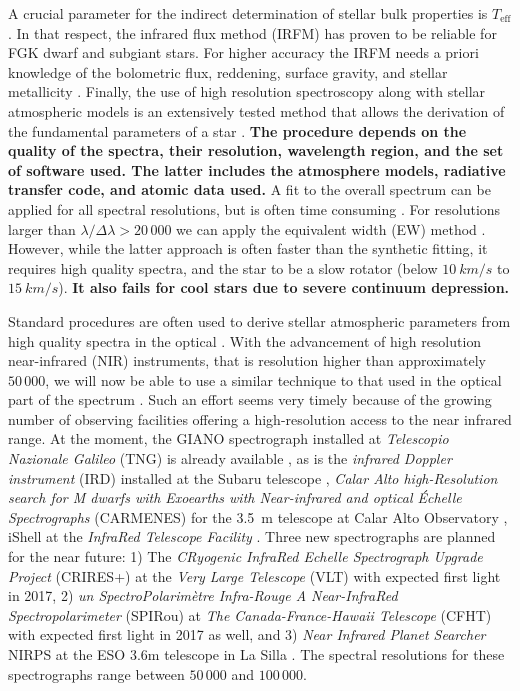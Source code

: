 \documentclass{aa}
\begin{document}
A crucial parameter for the indirect determination of stellar bulk properties is
$T_\mathrm{eff}$. In that respect, the infrared flux method (IRFM) has proven to
be reliable for FGK dwarf and subgiant stars. For higher accuracy the IRFM needs
a priori knowledge of the bolometric flux, reddening, surface gravity, and
stellar metallicity \citep{Blackwell1977,Ramirez2005b,Casagrande2010}. Finally,
the use of high resolution spectroscopy along with stellar atmospheric models is
an extensively tested method that allows the derivation of the fundamental
parameters of a star \citep[see e.g.][]{Valenti2005,Santos13,Worley2016}. {\bf
The procedure depends on the quality of the spectra, their resolution,
wavelength region, and the set of software used. The latter includes the
atmosphere models, radiative transfer code, and atomic data used.} A fit to the
overall spectrum can be applied for all spectral resolutions, but is often time
consuming \citep[see e.g.][]{Recio2006,Tsantaki2014}. For resolutions larger
than $\lambda/\Delta\lambda > 20\,000$ we can apply the equivalent width (EW)
method \citep[see e.g.][for details]{Tsantaki2013,Andreasen2017a}. However,
while the latter approach is often faster than the synthetic fitting, it
requires high quality spectra, and the star to be a slow rotator (below
$\SI{10}{km/s}$ to $\SI{15}{km/s}$). {\bf It also fails for cool stars due to
severe continuum depression.}

Standard procedures are often used to derive stellar atmospheric parameters from
high quality spectra in the optical \citep[see e.g.][]{Valenti2005,Sousa2008a}.
With the advancement of high resolution near-infrared (NIR) instruments, that is
resolution higher than approximately $50\,000$, we will now be able to use a
similar technique to that used in the optical part of the spectrum
\citep[see e.g.][]{Melendez1999,Sousa2008a,Tsantaki2013,Mucciarelli2013,Bensby2014}.
Such an effort seems very timely because of the growing number of observing
facilities offering a high-resolution access to the near infrared range. At the
moment, the GIANO spectrograph installed at \emph{Telescopio Nazionale Galileo}
(TNG) is already available \citep{GIANO}, as is the \emph{infrared Doppler
instrument} (IRD) installed at the Subaru telescope \citep{IRD}, \emph{Calar
Alto high-Resolution search for M dwarfs with Exoearths with Near-infrared and
optical Échelle Spectrographs} (CARMENES) for the \SI{3.5}{m} telescope at Calar
Alto Observatory \citep{CARMENES}, iShell at the \emph{InfraRed Telescope
Facility} \citep{ishell1,ishell2}. Three new spectrographs are planned for the
near future: 1) The \emph{CRyogenic InfraRed Echelle Spectrograph Upgrade
Project} (CRIRES+) at the \emph{Very Large Telescope} (VLT) \citep{CRIRESp} with
expected first light in 2017, 2) \emph{un SpectroPolarimètre Infra-Rouge A
Near-InfraRed Spectropolarimeter} (SPIRou) at \emph{The Canada-France-Hawaii
Telescope} (CFHT) \citep{SPIROU1,SPIROU2} with expected first light in 2017 as
well, and 3) \emph{Near Infrared Planet Searcher} NIRPS at the ESO 3.6m
telescope in La Silla \citep{NIRPS}. The spectral resolutions for these
spectrographs range between $50\,000$ and $100\,000$.
\end{document}
